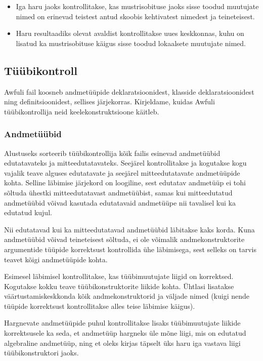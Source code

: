 \documentclass[12pt]{article}
\begin{document}
\begin{itemize}
\begin{itemize}
\begin{itemize}
                  \begin{itemize}
                    \item
                      Iga haru jaoks kontrollitakse, kas mustrisobituse jaoks sisse toodud muutujate nimed on erinevad teistest antud skoobis kehtivatest nimedest ja teineteisest.
                    \item
                      Haru resultaadiks olevat avaldist kontrollitakse uues keskkonnas, kuhu on lisatud ka mustrisobituse käigus sisse toodud lokaalsete muutujate nimed.
                  \end{itemize}
              \end{itemize}
          \end{itemize}
      \end{itemize}
    \subsection{Tüübikontroll}
      Awfuli fail koosneb andmetüüpide deklaratsioonidest, klasside deklaratsioonidest ning definitsioonidest, sellises järjekorras. Kirjeldame, kuidas Awfuli tüübikontrollija neid keelekonstruktsioone käitleb.
      \subsubsection{Andmetüübid}
        Alustuseks sorteerib tüübikontrollija kõik failis esinevad andmetüübid edutatavateks ja mitteedutatavateks. Seejärel kontrollitakse ja kogutakse kogu vajalik teave alguses edutatavate ja seejärel mitteedutatavate andmetüüpide kohta. Selline läbimise järjekord on loogiline, sest edutatav andmetüüp ei tohi sõltuda ühestki mitteedutatavast andmetüübist, samas kui mitteedutatud andmetüübid võivad kasutada edutatavaid andmetüüpe nii tavalisel kui ka edutatud kujul.

        Nii edutatavad kui ka mitteedutatavad andmetüübid läbitakse kaks korda. Kuna andmetüübid võivad teineteisest sõltuda, ei ole võimalik andmekonstruktorite argumentide tüüpide korrektsust kontrollida ühe läbimisega, sest selleks on tarvis teavet kõigi andmetüüpide kohta.

        Esimesel läbimisel kontrollitakse, kas tüübimuutujate liigid on korrektsed. Kogutakse kokku teave tüübikonstruktorite liikide kohta. Ühtlasi lisatakse väärtustamiskeskkonda kõik andmekonstruktorid ja väljade nimed (kuigi nende tüüpide korrektsust kontrollitakse alles teise läbimise käigus).

        Hargnevate andmetüüpide puhul kontrollitakse lisaks tüübimuutujate liikide korrektsusele ka seda, et andmetüüp hargneks üle mõne liigi, mis on edutatud algebraline andmetüüp, ning et oleks kirjas täpselt üks haru iga vastava liigi tüübikonstruktori jaoks.
\end{document}
